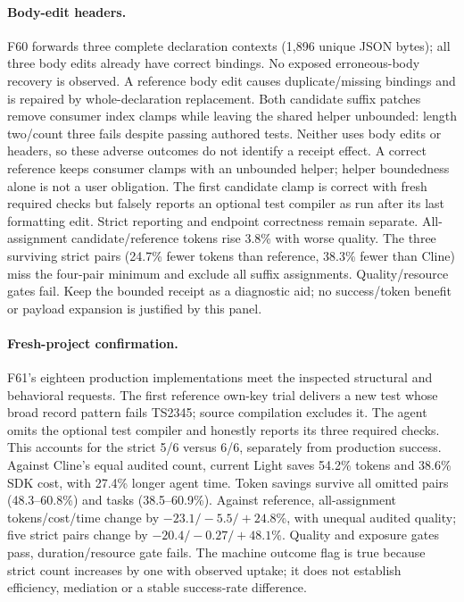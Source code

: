 \documentclass[11pt,a4paper]{article}
\begin{document}
\paragraph{Body-edit headers.}
F60 forwards three complete declaration contexts (1,896 unique JSON bytes);
all three body edits already have correct bindings. No exposed erroneous-body
recovery is observed. A reference body edit causes duplicate/missing bindings
and is repaired by whole-declaration replacement. Both candidate suffix patches
remove consumer index clamps while leaving the shared helper unbounded: length
two/count three fails despite passing authored tests. Neither uses body edits or
headers, so these adverse outcomes do not identify a receipt effect. A correct
reference keeps consumer clamps with an unbounded helper; helper boundedness
alone is not a user obligation. The first candidate clamp is correct with fresh
required checks but falsely reports an optional test compiler as run after its
last formatting edit. Strict reporting and endpoint correctness remain separate.
All-assignment candidate/reference tokens rise 3.8\% with worse quality. The
three surviving strict pairs (24.7\% fewer tokens than reference, 38.3\% fewer
than Cline) miss the four-pair minimum and exclude all suffix assignments.
Quality/resource gates fail. Keep the bounded receipt as a diagnostic aid;
no success/token benefit or payload expansion is justified by this panel.

\paragraph{Fresh-project confirmation.}
F61's eighteen production implementations meet the inspected structural and
behavioral requests. The first reference own-key trial delivers a new test whose
broad record pattern fails TS2345; source compilation excludes it. The agent
omits the optional test compiler and honestly reports its three required checks.
This accounts for the strict 5/6 versus 6/6, separately from production success.
Against Cline's equal audited count, current Light saves 54.2\% tokens and
38.6\% SDK cost, with 27.4\% longer agent time. Token savings survive all omitted
pairs (48.3--60.8\%) and tasks (38.5--60.9\%). Against reference, all-assignment
tokens/cost/time change by $-23.1/-5.5/+24.8$\%, with unequal audited quality;
five strict pairs change by $-20.4/-0.27/+48.1$\%. Quality and exposure gates
pass, duration/resource gate fails. The machine outcome flag is true because
strict count increases by one with observed uptake; it does not establish
efficiency, mediation or a stable success-rate difference.
\end{document}
